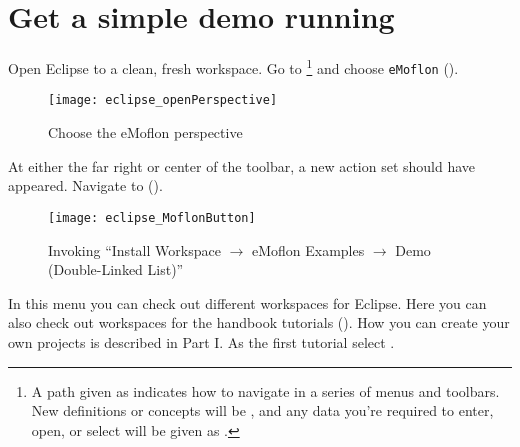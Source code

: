 \newpage
\genHeader

\section{Get a simple demo running}


\begin{stepbystep}
\hypertarget{simpleDemo common}{} 
\item
Open Eclipse to a clean, fresh workspace.
Go to  \footnote{A path given as  indicates how to navigate in a series of menus and toolbars.
New definitions or concepts will be , and any data you're required to enter, open, or select will be given as .} and choose \texttt{eMoflon} ().

\begin{figure}[htbp]
	\centering
  \texttt{[image: eclipse\_openPerspective]}
	\caption{Choose the eMoflon perspective}
	\label{eclipse:openPerspective}
\end{figure} 

\item
At either the far right or center of the toolbar, a new action set should have appeared.
Navigate to  
().
%
\vspace{0.5cm}
\begin{figure}[htbp]
	\centering
  \texttt{[image: eclipse\_MoflonButton]}
	\caption{Invoking \enquote{Install Workspace $\to$ eMoflon Examples $\to$ Demo (Double-Linked List)}}
	\label{eclipse:newMetamodel}
\end{figure}

\item
In this menu you can check out different workspaces for Eclipse. 
Here you can also check out workspaces for the handbook tutorials ().
How you can create your own projects is described in Part I.
As the first tutorial select . 


\end{stepbystep}
